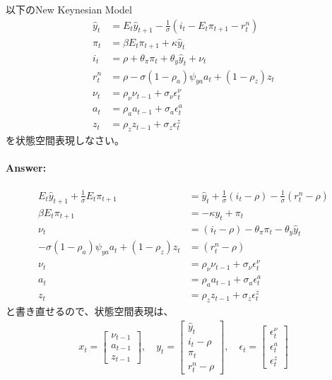 \documentclass[a4j, dvipdfmx]{jarticle}
\begin{document}
以下のNew Keynesian Model
\begin{align}
\hat{y}_t &= E_t \hat{y}_{t+1} -\frac{1}{\sigma} (i_t - E_t\pi_{t+1} - r^n_t) \\
\pi_t &= \beta E_t\pi_{t+1} + \kappa \hat{y}_t\\
i_t &= \rho + \theta_\pi \pi_t + \theta_y \hat{y}_t + \nu_t \\
r^n_t &= \rho - \sigma (1-\rho_a) \psi_{ya} a_t +(1-\rho_z)z_t\\
\nu_t &= \rho_\nu \nu_{t-1} + \sigma_\nu \epsilon^\nu_t\\
a_t &= \rho_a a_{t-1} + \sigma_a \epsilon^a_t\\
z_t &= \rho_z z_{t-1} + \sigma_z \epsilon^z_t
\end{align}
を状態空間表現しなさい。

\paragraph{Answer:}
\begin{align}
E_t\hat{y}_{t+1} + \frac{1}{\sigma}E_t\pi_{t+1} &= \hat{y}_t + \frac{1}{\sigma}(i_t - \rho) - \frac{1}{\sigma} (r^n_t - \rho) \\
\beta E_t\pi_{t+1} &= -\kappa y_t + \pi_t\\
\nu_t &= (i_t - \rho) - \theta_\pi \pi_t - \theta_y \hat{y}_t\\
-\sigma(1-\rho_a)\psi_{ya} a_t + (1-\rho_z)z_t &= (r^n_t - \rho)\\
\nu_t &= \rho_\nu \nu_{t-1} + \sigma_\nu \epsilon^\nu_t\\
a_t &= \rho_a a_{t-1} + \sigma_a \epsilon^a_t\\
z_t &= \rho_z z_{t-1} + \sigma_z \epsilon^z_t
\end{align}
と書き直せるので、状態空間表現は、
\begin{align}
x_t = \begin{bmatrix} \nu_{t-1} \\ a_{t-1} \\ z_{t-1} \end{bmatrix}, \quad y_t = \begin{bmatrix}\hat{y}_t \\ i_t - \rho \\ \pi_t \\ r^n_t - \rho\end{bmatrix}, \quad \epsilon_t = \begin{bmatrix}\epsilon^\nu_t \\ \epsilon^a_t \\ \epsilon^z_t\end{bmatrix}
\end{align}
\end{document}
